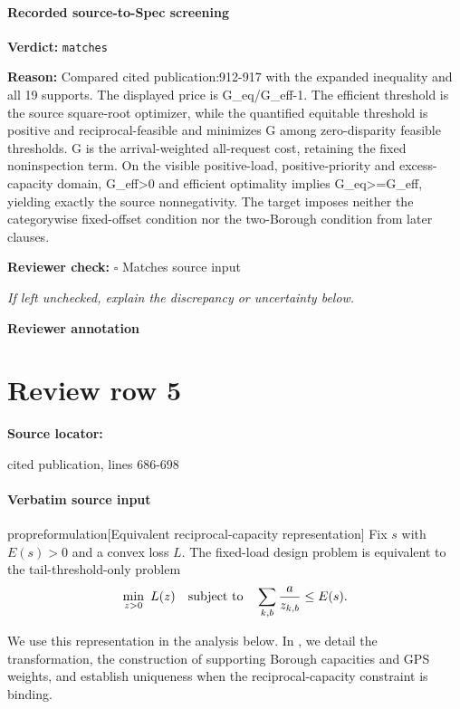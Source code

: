 \documentclass[10pt]{article}
\newcommand{\reviewerbox}{%
  \par\noindent\fbox{\parbox{0.96\linewidth}{\rule{0pt}{0.38in}}}\par
}
\newcommand{\reviewmatch}[1]{%
  \par\noindent\textbf{Reviewer check:} $\square$\; #1\par
  \noindent\emph{If left unchecked, explain the discrepancy or uncertainty below.}\par
}
\begin{document}
\paragraph{Recorded source-to-Spec screening}
\textbf{Verdict:} \texttt{matches}
\\
{\raggedright
\textbf{Reason:} Compared cited publication:\allowbreak{}912-\allowbreak{}917 with the expanded inequality and all 19 supports.\allowbreak{} The displayed price is G\_\allowbreak{}eq/\allowbreak{}G\_\allowbreak{}eff-\allowbreak{}1.\allowbreak{} The efficient threshold is the source square-\allowbreak{}root optimizer, while the quantified equitable threshold is positive and reciprocal-\allowbreak{}feasible and minimizes G among zero-\allowbreak{}disparity feasible thresholds.\allowbreak{} G is the arrival-\allowbreak{}weighted all-\allowbreak{}request cost, retaining the fixed noninspection term.\allowbreak{} On the visible positive-\allowbreak{}load, positive-\allowbreak{}priority and excess-\allowbreak{}capacity domain, G\_\allowbreak{}eff>0 and efficient optimality implies G\_\allowbreak{}eq>=G\_\allowbreak{}eff, yielding exactly the source nonnegativity.\allowbreak{} The target imposes neither the categorywise fixed-\allowbreak{}offset condition nor the two-\allowbreak{}Borough condition from later clauses.\allowbreak{}
\par}
\reviewmatch{Matches source input}
\noindent\textbf{Reviewer annotation}\par
\reviewerbox
\clearpage
\hypertarget{source-claim-4cd21b142e438fb6}{}
\section*{Review row 5}
\textbf{Source locator:} {\footnotesize\raggedright cited publication, lines 686-\allowbreak{}698\par}
\paragraph{Verbatim source input}
\begin{ReviewVerbatim}
\begin{restatable}{prop}{reformulation}[Equivalent reciprocal-capacity representation]
\label{prop:opt-reformulation}
{Fix $s$ with $E(s)>0$ and a convex loss $L$. The fixed-load design
problem is equivalent to the tail-threshold-only problem}
\begin{equation}
  \min_{z>0}\ L(z)
  \quad\textnormal{subject to}\quad
  \sum_{k,b}\frac{a}{z_{k,b}}\leq E(s).
  \label{opt-reformulated}
\end{equation}
\end{restatable}
We use this representation in the analysis below. In , we detail the transformation, the construction of supporting Borough capacities and GPS
weights, and establish uniqueness when the reciprocal-capacity constraint is binding.
\end{ReviewVerbatim}
\end{document}
